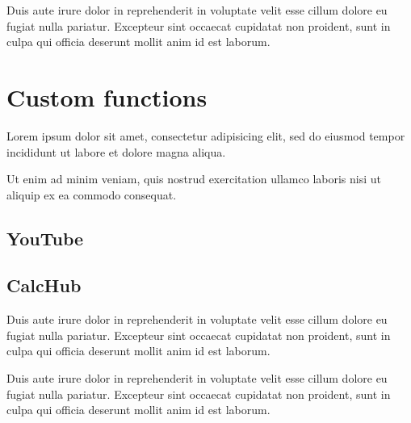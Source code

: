 Duis aute irure dolor in reprehenderit in voluptate velit esse cillum dolore eu fugiat nulla pariatur. Excepteur sint occaecat cupidatat non proident, sunt in culpa qui officia deserunt mollit anim id est laborum. 

\section{Custom functions}
Lorem ipsum dolor sit amet, consectetur adipisicing elit, sed do eiusmod tempor incididunt ut labore et dolore magna aliqua.

Ut enim ad minim veniam, quis nostrud exercitation ullamco laboris nisi ut aliquip ex ea commodo consequat.

\subsection{YouTube}


\subsection{CalcHub}

Duis aute irure dolor in reprehenderit in voluptate velit esse cillum dolore eu fugiat nulla pariatur. Excepteur sint occaecat cupidatat non proident, sunt in culpa qui officia deserunt mollit anim id est laborum. 


Duis aute irure dolor in reprehenderit in voluptate velit esse cillum dolore eu fugiat nulla pariatur. Excepteur sint occaecat cupidatat non proident, sunt in culpa qui officia deserunt mollit anim id est laborum. 




